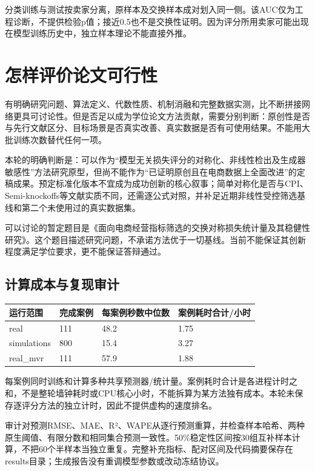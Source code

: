 \documentclass[UTF8,11pt,a4paper]{ctexart}
\begin{document}
分类训练与测试按卖家分离，原样本及交换样本成对划入同一侧。该AUC仅为工程诊断，不提供检验p值；接近0.5也不是交换性证明。因为评分所用卖家可能出现在模型训练历史中，独立样本理论不能直接外推。

\section{怎样评价论文可行性}\label{ux600eux6837ux8bc4ux4ef7ux8bbaux6587ux53efux884cux6027}

有明确研究问题、算法定义、代数性质、机制消融和完整数据实测，比不断拼接网络更具可讨论性。但是否足以成为学位论文方法贡献，需要分别判断：原创性是否与先行文献区分、目标场景是否真实改善、真实数据是否有可使用结果。不能用大批训练次数替代任何一项。

本轮的明确判断是：可以作为``模型无关损失评分的对称化、非线性检出及生成器敏感性''方法研究原型，但尚不能作为``已证明原创且在电商数据上全面改进''的定稿成果。预定标准化版本不宜成为成功创新的核心叙事；简单对称化是否与CPI、Semi-knockoffs等文献实质不同，还需逐公式对照，并补足近期非线性受控筛选基线和第二个未使用过的真实数据集。

可以讨论的暂定题目是《面向电商经营指标筛选的交换对称损失统计量及其稳健性研究》。这个题目描述研究问题，不承诺方法优于一切基线。当前不能保证其创新程度满足学位要求，更不能保证答辩通过。

\subsection{计算成本与复现审计}\label{ux8ba1ux7b97ux6210ux672cux4e0eux590dux73b0ux5ba1ux8ba1}

{\def\LTcaptype{none} %
{
\footnotesize
\begin{longtable}[]{@{}llll@{}}
\toprule\noalign{}
运行范围 & 完成案例 & 每案例秒数中位数 & 案例耗时合计/小时 \\
\midrule\noalign{}
\endhead
\bottomrule\noalign{}
\endlastfoot
real & 111 & 48.2 & 1.75 \\
simulations & 800 & 15.4 & 3.27 \\
real\_mvr & 111 & 57.9 & 1.88 \\
\end{longtable}
}
}

每案例同时训练和计算多种共享预测器/统计量。案例耗时合计是各进程计时之和，不是整轮墙钟耗时或CPU核心小时，不能拆算为某方法独有成本。本轮未保存逐评分方法的独立计时，因此不提供虚构的速度排名。

审计对预测RMSE、MAE、R²、WAPE从逐行预测重算，并检查样本哈希、两种原生阈值、有限分数和相同集合预测一致性。50\%稳定性区间按30组互补样本计算，不把60个半样本当独立重复。完整补充指标、配对区间及代码摘要保存在results目录；生成报告没有重调模型参数或改动冻结协议。
\end{document}
